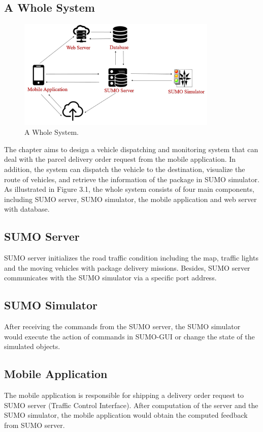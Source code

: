 \documentclass[12pt]{ksthesis}
\begin{document}
\begin{thesis}
{\section{A Whole System}

\begin{figure}[t!]
\centering
\includegraphics[width=0.85\textwidth]{./Thesis_figures/F3-1_a_whole_system.PNG}
\caption{\large A Whole System.}
\vspace{0.5cm}
\label{Fig:A_Whole_System}
\end{figure}

The chapter aims to design a vehicle dispatching and monitoring system that can deal with the parcel delivery order request from the mobile application. In addition, the system can dispatch the vehicle to the destination, visualize the route of vehicles, and retrieve the information of the package in SUMO simulator.
As illustrated in Figure 3.1, the whole system consists of four main components, including SUMO server, SUMO simulator, the mobile application and web server with database.

\subsection{SUMO Server}
SUMO server initializes the road traffic condition including the map, traffic lights and the moving vehicles with package delivery missions. Besides, SUMO server communicates with the SUMO simulator via a specific port address.

\subsection{SUMO Simulator}
After receiving the commands from the SUMO server, the SUMO simulator would execute the action of commands in SUMO-GUI or change the state of the simulated objects.

\subsection{Mobile Application}
The mobile application is responsible for shipping a delivery order request to SUMO server (Traffic Control Interface). After computation of the server and the SUMO simulator, the mobile application would obtain the computed feedback from SUMO server.

}
\end{thesis}
\end{document}
